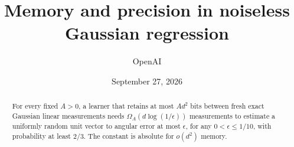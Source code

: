 \documentclass[11pt]{article}
\title{Memory and precision in noiseless Gaussian regression}
\author{OpenAI}
\date{September 27, 2026}
\begin{document}
\maketitle
\begin{abstract}
For every fixed \(A>0\), a learner that retains at most \(Ad^2\) bits
between fresh exact Gaussian linear measurements needs
\(\Omega_A(d\log(1/\epsilon))\) measurements to estimate a uniformly
random unit vector to angular error at most \(\epsilon\), for any
\(0<\epsilon\le 1/10\), with probability at least \(2/3\). The constant
is absolute for \(o(d^2)\) memory.
\end{abstract}
\tableofcontents








\appendix






\end{document}
